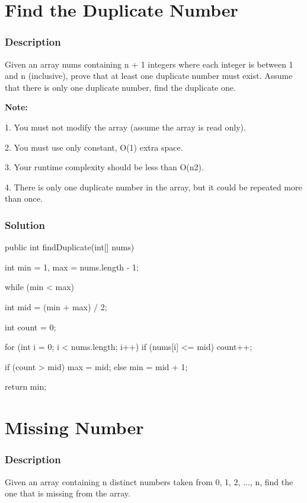 \newpage

\section{Find the Duplicate Number} %

\subsubsection{Description}
Given an array nums containing n + 1 integers where each integer is between 1 and n (inclusive), prove that at least one duplicate number must exist. Assume that there is only one duplicate number, find the duplicate one.

\textbf{Note:}

1. You must not modify the array (assume the array is read only).

2. You must use only constant, O(1) extra space.

3. Your runtime complexity should be less than O(n2).

4. There is only one duplicate number in the array, but it could be repeated more than once.

\subsubsection{Solution}

\begin{Code}
public int findDuplicate(int[] nums) {
    int min = 1, max = nums.length - 1;

    while (min < max) {
        int mid = (min + max) / 2;

        int count = 0;

        for (int i = 0; i < nums.length; i++) {
            if (nums[i] <= mid) {
                count++;
            }
        }

        if (count > mid) {
            max = mid;
        } else {
            min = mid + 1;
        }
    }

    return min;
}
\end{Code}

\newpage

\section{Missing Number} %

\subsubsection{Description}
Given an array containing n distinct numbers taken from 0, 1, 2, ..., n, find the one that is missing from the array.

